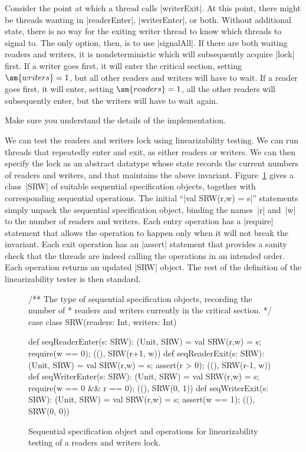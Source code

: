 Consider the point at which a thread calls |writerExit|.  At this point, there
might be threads wanting in |readerEnter|, |writerEnter|, or both.  Without
additional state, there is no way for the exiting writer thread to know which
threads to signal to.  The only option, then, is to use |signalAll|.  If there
are both waiting readers and writers, it is nondeterministic which will
subsequently acquire |lock| first.  If a writer goes first,
it will enter the critical section, setting $\sm{writers} = 1$, but all other
readers and writers will have to wait.  If a reader goes first, it will enter,
setting $\sm{readers} = 1$, all the other readers will subsequently enter, but
the writers will have to wait again.

\begin{instruction}
Make sure you understand the details of the implementation.
\end{instruction}

We can test the readers and writers lock using linearizability testing.  We
can run threads that repeatedly enter and exit, as either readers or writers.
We can then specify the lock as an abstract datatype whose state records the
current numbers of readers and writers, and that maintains the above
invariant.  Figure~\ref{fig:rw-seq-spec} gives a class~|SRW| of suitable
sequential specification objects, together with corresponding sequential
operations.  The initial ``|val SRW(r,w) = s|'' statements simply unpack the
sequential specification object, binding the names~|r| and~|w| to the number
of readers and writers.  Each entry operation has a |require| statement that
allows the operation to happen only when it will not break the invariant.
Each exit operation has an |assert| statement that provides a sanity check
that the threads are indeed calling the operations in an intended order.  Each
operation returns an updated |SRW| object.  The rest of the definition of the
linearizability tester is then standard.


\begin{figure}
\begin{scala}
  /** The type of sequential specification objects, recording the number of
    * readers and writers currently in the critical section. */
  case class SRW(readers: Int, writers: Int)

  def seqReaderEnter(s: SRW): (Unit, SRW) = {
    val SRW(r,w) = s; require(w == 0); ((), SRW(r+1, w))
  }
  def seqReaderExit(s: SRW): (Unit, SRW) = {
    val SRW(r,w) = s; assert(r > 0); ((), SRW(r-1, w))
  }
  def seqWriterEnter(s: SRW): (Unit, SRW) = {
    val SRW(r,w) = s; require(w == 0 && r == 0); ((), SRW(0, 1))
  }
  def seqWriterExit(s: SRW): (Unit, SRW) = {
    val SRW(r,w) = s; assert(w == 1); ((), SRW(0, 0))
  }
\end{scala}
\caption{Sequential specification object and operations for linearizability
  testing of a readers and writers lock.}
\label{fig:rw-seq-spec}
\end{figure}

